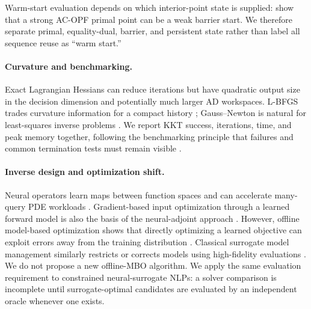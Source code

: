 Warm-start evaluation depends on which interior-point state is supplied:
\citet{suri2026warp} show that a strong AC-OPF primal point can be a weak
barrier start.  We therefore separate primal, equality-dual, barrier, and
persistent state rather than label all sequence reuse as ``warm start.''

\paragraph{Curvature and benchmarking.}
Exact Lagrangian Hessians can reduce iterations but have quadratic output size
in the decision dimension and potentially much larger AD workspaces.
L-BFGS trades curvature information for a compact history
\citep{liu1989lbfgs}; Gauss--Newton is natural for least-squares inverse
problems \citep{nocedal2006numerical}.  We report KKT success, iterations,
time, and peak memory together, following the
benchmarking principle that failures and common termination tests must remain
visible \citep{dolan2002profiles}.

\paragraph{Inverse design and optimization shift.}
Neural operators learn maps between function spaces and can accelerate
many-query PDE workloads \citep{li2021fno,kovachki2023neuraloperator}.
Gradient-based input optimization through a learned forward model is also the
basis of the neural-adjoint approach \citep{ren2020neuraladjoint}.  However,
offline model-based optimization shows that directly optimizing a learned
objective can exploit errors away from the training distribution
\citep{trabucco2021coms,trabucco2022designbench}.  Classical surrogate model
management similarly restricts or corrects models using high-fidelity
evaluations \citep{alexandrov2000modelmanagement}.  We do not propose a new
offline-MBO algorithm.  We apply the same evaluation requirement to
constrained neural-surrogate NLPs: a solver comparison is incomplete until
surrogate-optimal candidates are evaluated by an independent oracle whenever
one exists.
